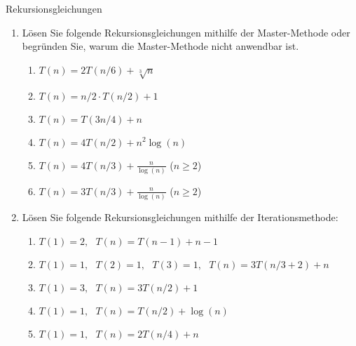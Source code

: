 \documentclass[11pt,a4paper]{article}
\begin{document}
\thispagestyle{empty}




\begin{aufgabe}{1}{Rekursionsgleichungen}
\begin{enumerate}
    \item Lösen Sie folgende Rekursionsgleichungen mithilfe der Master-Methode oder begründen Sie, warum die Master-Methode nicht anwendbar ist.
    \begin{enumerate}[label=\roman*)]
        \item $T(n) = 2T(n / 6) + \sqrt[3]{n}$
        \item $T(n) = n / 2 \cdot T(n / 2) + 1$
        \item $T(n) = T(3n / 4) + n$
        \item $T(n) = 4T(n / 2) + n^2 \log(n)$
        \item $T(n) = 4T(n / 3) + \frac{n}{\log(n)}$ ($n \geq 2$)
        \item $T(n) = 3T(n / 3) + \frac{n}{\log(n)}$ ($n \geq 2$)
    \end{enumerate}

    \item Lösen Sie folgende Rekursionsgleichungen mithilfe der Iterationsmethode:
    \begin{enumerate}[label=\roman*)]
        \item $T(1) = 2, \,\,\,\, T(n) = T(n - 1) + n - 1$
        \item $T(1) = 1, \,\,\,\, T(2) = 1, \,\,\,\, T(3) = 1, \,\,\,\, T(n) = 3T(n / 3 + 2) + n$
        \item $T(1) = 3, \,\,\,\, T(n) = 3T(n / 2) + 1$
        \item $T(1) = 1, \,\,\,\, T(n) = T(n / 2) + \log(n)$
        \item $T(1) = 1, \,\,\,\, T(n) = 2T(n / 4) + n$
    \end{enumerate}


\end{enumerate}
\end{aufgabe}
\end{document}
